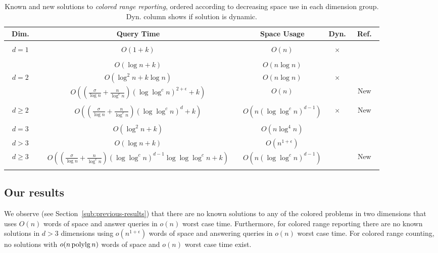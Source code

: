 \begin{table}[ht]
    \centering
    \begin{tabular}{c c c c c}
    ~Dim.~ & Query Time               & Space Usage                          & Dyn. & ~Ref.~     \\[1mm]
    \hline\\[-3mm]
    $d=1$        & $O(1+k)$         & $O(n)$              & $\times$ & \cite{nekrich2013optimal}             \\[1mm]
    \hline\\[-3mm]
                 & $O(\log n+k)$    & $O(n \log n)$       & & \cite{shi2005optimal}                 \\
    $d=2$        & $O(\log^2 n+k\log n)$    & $O(n \log n)$       & $\times$ & \cite{gupta1995further, bozanis1995new}  \\
                & $O\left( ( \frac{\sigma}{\log n} + \frac{n}{\log ^c n} ) (\log\log^c n)^{2+\epsilon}  + k\right)$ & $O(n)$  & & New \\[1mm]
     \hline\\[-3mm]
    $d\geq 2$  & $O\left( ( \frac{\sigma}{\log n} + \frac{n}{\log ^c n} ) (\log \log ^c n)^{d} + k\right)$ & $O\!\left(n (\log \log^{c} n)^{d-1} \right)$ & $\times$ & New \\[1mm]
    \hline\\[-3mm]
    $d=3$        & $O(\log ^2 n+k)$ & $O(n \log^4 n)$     & & \cite{gupta1995further}               \\
    $d> 3$      & $O(\log n+k)$    & $O(n^{1+\epsilon})$ & & \cite{van1992new, gupta1997technique} \\ 
    $d \geq 3$        & ~~$O\left(( \frac{\sigma}{\log n} + \frac{n}{\log^c n} ) (\log\log^c n)^{d-1} \log \log \log^c n + k\right)$~~ & $O\!\left(n (\log\log^c n)^{d-1}\right)$ & & New \\[1mm]
\hline\\[-3mm]
    \end{tabular}
    \caption{Known and new solutions to \emph{colored range reporting}, ordered according to decreasing space use in each dimension group. Dyn. column shows if solution is dynamic.}
\label{tab:report}
\end{table}


\subsection{Our results}
\label{sub:our-results}
%
We observe (see Section~\ref{sub:previous-results}) that there are no known solutions to any of the colored problems in two dimensions that uses $O(n)$ words of space and answer queries in $o(n)$ worst case time. Furthermore, for colored range reporting there are no known solutions in $d> 3$ dimensions using $o(n^{1+\epsilon})$ words of space and answering queries in $o(n)$ worst case time. For colored range counting, no solutions with $o(n \mathrm{\, polylg \,} n)$ words of space and $o(n)$ worst case time exist. 

